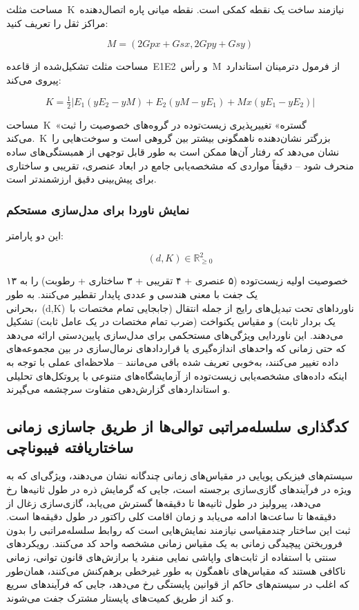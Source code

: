 \documentclass[12pt, a4paper]{article}
\begin{document}
مساحت مثلث K نیازمند ساخت یک نقطه کمکی است. نقطه میانی پاره اتصال‌دهنده مراکز ثقل را تعریف کنید:

\begin{equation}
M=(2Gpx+Gsx,2Gpy+Gsy)
\end{equation}

مساحت مثلث تشکیل‌شده از قاعده E1E2 و رأس M از فرمول دترمینان استاندارد پیروی می‌کند:

\begin{equation}
K=\tfrac{1}{2}|E_{1}(yE_{2}-yM)+E_{2}(yM-yE_{1})+Mx(yE_{1}-yE_{2})|
\end{equation}

مساحت K «گستره» تغییرپذیری زیست‌توده در گروه‌های خصوصیت را ثبت می‌کند. K بزرگتر نشان‌دهنده ناهمگونی بیشتر بین گروهی است و سوخت‌هایی را نشان می‌دهد که رفتار آن‌ها ممکن است به طور قابل توجهی از همبستگی‌های ساده منحرف شود – دقیقاً مواردی که مشخصه‌یابی جامع در ابعاد عنصری، تقریبی و ساختاری برای پیش‌بینی دقیق ارزشمندتر است.

\subsubsection{نمایش ناوردا برای مدل‌سازی مستحکم}

این دو پارامتر:

\begin{equation}
(d,K)\in\mathbb{R}_{\ge 0}^{2}
\end{equation}

۱۳ خصوصیت اولیه زیست‌توده (۵ عنصری + ۴ تقریبی + ۳ ساختاری + رطوبت) را به یک جفت با معنی هندسی و عددی پایدار تقطیر می‌کنند. به طور بحرانی، (d,K) ناورداهای تحت تبدیل‌های رایج از جمله انتقال (جابجایی تمام مختصات با یک بردار ثابت) و مقیاس یکنواخت (ضرب تمام مختصات در یک عامل ثابت) تشکیل می‌دهند. این ناوردایی ویژگی‌های مستحکمی برای مدل‌سازی پایین‌دستی ارائه می‌دهد که حتی زمانی که واحدهای اندازه‌گیری یا قراردادهای نرمال‌سازی در بین مجموعه‌های داده تغییر می‌کنند، به‌خوبی تعریف شده باقی می‌مانند – ملاحظه‌ای عملی با توجه به اینکه داده‌های مشخصه‌یابی زیست‌توده از آزمایشگاه‌های متنوعی با پروتکل‌های تحلیلی و استانداردهای گزارش‌دهی متفاوت سرچشمه می‌گیرند.

\subsection{کدگذاری سلسله‌مراتبی توالی‌ها از طریق جاسازی زمانی ساختاریافته فیبوناچی}

سیستم‌های فیزیکی پویایی در مقیاس‌های زمانی چندگانه نشان می‌دهند، ویژگی‌ای که به ویژه در فرآیندهای گازی‌سازی برجسته است، جایی که گرمایش ذره در طول ثانیه‌ها رخ می‌دهد، پیرولیز در طول ثانیه‌ها تا دقیقه‌ها گسترش می‌یابد، گازی‌سازی زغال از دقیقه‌ها تا ساعت‌ها ادامه می‌یابد و زمان اقامت کلی راکتور در طول دقیقه‌ها است. ثبت این ساختار چندمقیاسی نیازمند نمایش‌هایی است که روابط سلسله‌مراتبی را بدون فروریختن پیچیدگی زمانی به یک مقیاس زمانی مشخصه واحد کد می‌کنند. رویکردهای سنتی با استفاده از ثابت‌های واپاشی نمایی منفرد یا برازش‌های قانون توانی، زمانی ناکافی هستند که مقیاس‌های ناهمگون به طور غیرخطی برهم‌کنش می‌کنند، همان‌طور که اغلب در سیستم‌های حاکم از قوانین پایستگی رخ می‌دهد، جایی که فرآیندهای سریع و کند از طریق کمیت‌های پایستار مشترک جفت می‌شوند.
\end{document}
